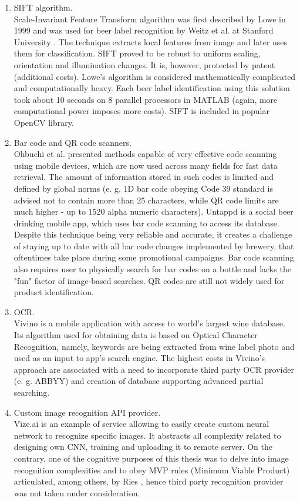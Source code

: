 \documentclass[11pt]{article}
\begin{document}
\begin{enumerate}[1)]
\item SIFT algorithm.\\
Scale-Invariant Feature Transform algorithm was first described by Lowe in 1999 \cite{lowe_sift} and was used for beer label recognition by Weitz et al. at Stanford University \cite{beer_sift}. The technique extracts local features from image and later uses them for classification. SIFT proved to be robust to uniform scaling, orientation and illumination changes. It is, however, protected by patent (additional costs). Lowe's algorithm is considered mathematically complicated and computationally heavy. Each beer label identification using this solution took about 10 seconds on 8 parallel processors in MATLAB (again, more computational power imposes more costs). SIFT is included in popular OpenCV library.
\item Bar code and QR code scanners.\\
Ohbuchi et al. \cite{barcode_mobile} presented methods capable of very effective code scanning using mobile devices, which are now used across many fields for fast data retrieval. The amount of information stored in such codes is limited and defined by global norms (e. g. 1D bar code obeying Code 39 standard is advised not to contain more than 25 characters, while QR code limits are much higher - up to 1520 alpha numeric characters). Untappd is a social beer drinking mobile app, which uses bar code scanning to access its database. Despite this technique being very reliable and accurate, it creates a challenge of staying up to date with all bar code changes implemented by brewery, that oftentimes take place during some promotional campaigns. Bar code scanning also requires user to physically search for bar codes on a bottle and lacks the "fun" factor of image-based searches. QR codes are still not widely used for product identification.
\item OCR.\\
Vivino is a mobile application with access to world's largest wine database. Its algorithm used for obtaining data is based on Optical Character Recognition, namely, keywords are being extracted from wine label photo and used as an input to app's search engine. The highest costs in Vivino's approach are associated with a need to incorporate third party OCR provider (e. g. ABBYY) and creation of database supporting advanced partial searching. 
\item Custom image recognition API provider.\\
Vize.ai is an example of service allowing to easily create custom neural network to recognize specific images. It abstracts all complexity related to designing own CNN, training and uploading it to remote server. On the contrary, one of the cognitive purposes of this thesis was to delve into image recognition complexities and to obey MVP rules (Minimum Viable Product) articulated, among others, by Ries \cite{lean_startup}, hence third party recognition provider was not taken under consideration.
\end{enumerate} 
\clearpage
\end{document}
